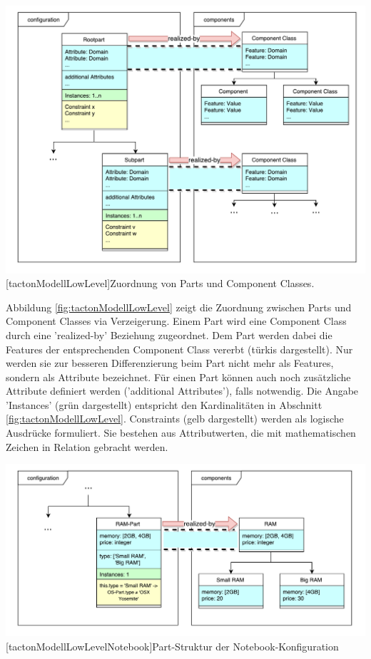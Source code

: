 \documentclass[12pt,a4paper,bibliography=totocnumbered,listof=totoc]{scrartcl}
\begin{document}
\vspace{1em}
\begin{minipage}{\linewidth}
	\centering
	\includegraphics[width=1\linewidth]{Abbildungen/tactonModellLowLevel.pdf}
	[tactonModellLowLevel]{Zuordnung von Parts und Component Classes.}
	\label{fig:tactonModellLowLevel}
\end{minipage}
\vspace{1em}

Abbildung \ref{fig:tactonModellLowLevel} zeigt die Zuordnung zwischen Parts und Component Classes via Verzeigerung. Einem Part wird eine Component Class durch eine 'realized-by' Beziehung zugeordnet. Dem Part werden dabei die Features der entsprechenden Component Class vererbt (türkis dargestellt). Nur werden sie zur besseren Differenzierung beim Part nicht mehr als Features, sondern als Attribute bezeichnet. Für einen Part können auch noch zusätzliche Attribute definiert werden ('additional Attributes'), falls notwendig. Die Angabe 'Instances' (grün dargestellt) entspricht den Kardinalitäten in Abschnitt \ref{fig:tactonModellLowLevel}. Constraints (gelb dargestellt) werden als logische Ausdrücke formuliert. Sie bestehen aus Attributwerten, die mit mathematischen Zeichen in Relation gebracht werden.

\vspace{1em}
\begin{minipage}{\linewidth}
	\centering
	\includegraphics[width=1\linewidth]{Abbildungen/tactonModellLowLevelNotebook.pdf}
	[tactonModellLowLevelNotebook]{Part-Struktur der Notebook-Konfiguration}
	\label{fig:tactonModellLowLevelNotebook}
\end{minipage}
\vspace{1em}
\end{document}
